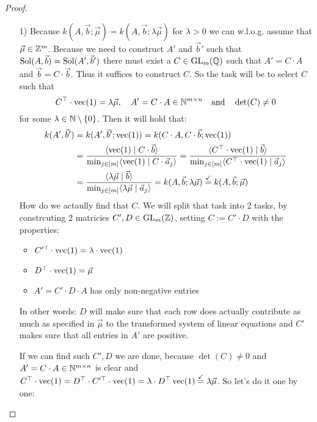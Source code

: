 \begin{proof}
    \begin{enumerate}
        \item[1)] Because $k(A, \vec b; \vec \mu) = k(A, \vec b; \lambda \vec \mu)$ for $\lambda > 0$ we can w.l.o.g. assume that $\vec \mu \in \mathbb{Z}^m$. Because we need to construct $A'$ and $\vec b'$ such that $\operatorname{Sol}(A, \vec b) = \operatorname{Sol}(A', \vec b')$ there must exist a $C \in \operatorname{GL}_m(\mathbb{Q})$ such that $A' = C\cdot A$ and $\vec b = C\cdot \vec b$. Thus it suffices to construct $C$. So the task will be to select $C$ such that
        $$C^\top \cdot \operatorname{vec}(1) = \lambda \vec\mu, \quad A' = C\cdot A \in \mathbb{N}^{m \times n} \quad \textrm{and} \quad \det(C) \neq 0$$
        for some $\lambda \in \mathbb{N} \setminus \{0\}$. Then it will hold that:
        \begin{align*}
            k(A', \vec b') &= k(A', \vec b'; \operatorname{vec}(1)) = k(C \cdot A, C \cdot \vec b; \operatorname{vec}(1))\\
            &= \frac{\langle \operatorname{vec}(1) \mid C \cdot \vec b \rangle}{\min_{j \in [m]} \langle \operatorname{vec}(1) \mid C \cdot \vec a_j \rangle} = \frac{\langle C^\top \cdot \operatorname{vec}(1) \mid \vec b \rangle}{\min_{j \in [m]} \langle C^\top \cdot \operatorname{vec}(1) \mid \vec a_j \rangle}\\
            &= \frac{\langle \lambda\vec{\mu} \mid \vec b \rangle}{\min_{j \in [m]} \langle \lambda\vec \mu \mid \vec a_j \rangle} = k(A, \vec b; \lambda\vec\mu) \stackrel{\checkmark}{=} k(A, \vec b; \vec\mu)
        \end{align*}
        How do we actaully find that $C$. We will split that task into 2 tasks, by constrcuting 2 matricies $C', D  \in \operatorname{GL}_m(\mathbb{Z})$, setting $C := C' \cdot D$ with the properties:
        \begin{itemize}
            \item $C'^\top \cdot \operatorname{vec}(1) = \lambda \cdot \operatorname{vec}(1)$
            \item $D^\top \cdot \operatorname{vec}(1) = \vec\mu$
            \item $A' = C' \cdot D\cdot A$ has only non-negative entries
        \end{itemize}
        In other words: $D$ will make sure that each row does actually contribute as much as specified in $\vec\mu$ to the transformed system of linear equations and $C'$ makes sure that all entries in $A'$ are positive.

        If we can find such $C', D$ we are done, because $\det(C) \neq 0$ and $ A' = C\cdot A \in \mathbb{N}^{m \times n}$ is clear and $C^\top \cdot \operatorname{vec}(1) = D^\top \cdot C'^\top\cdot \operatorname{vec}(1) = \lambda \cdot D^\top \operatorname{vec}(1) \stackrel{\checkmark}{=}\lambda\vec\mu$. So let's do it one by one:


\end{enumerate}
\end{proof}
